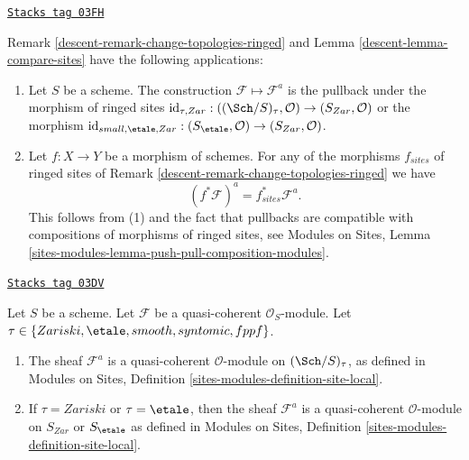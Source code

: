 \begin{remark}
\label{descent-remark-change-topologies-ringed-sites}
\href{https://stacks.math.columbia.edu/tag/03FH}{\texttt{Stacks tag 03FH}}

Remark \ref{descent-remark-change-topologies-ringed}
and
Lemma \ref{descent-lemma-compare-sites}
have the following applications:
\begin{enumerate}
\item Let $S$ be a scheme.
The construction $\mathcal{F} \mapsto \mathcal{F}^a$ is
the pullback under the morphism of ringed sites
$\text{id}_{\tau, Zar} : ((\Sch/S)_\tau, \mathcal{O})
\to (S_{Zar}, \mathcal{O})$
or the morphism
$\text{id}_{small, \etale, Zar} :
(S_\etale, \mathcal{O}) \to (S_{Zar}, \mathcal{O})$.
\item Let $f : X \to Y$ be a morphism of schemes.
For any of the morphisms $f_{sites}$ of ringed sites of
Remark \ref{descent-remark-change-topologies-ringed}
we have
$$
(f^*\mathcal{F})^a = f_{sites}^*\mathcal{F}^a.
$$
This follows from (1) and the fact that pullbacks are compatible with
compositions of morphisms of ringed sites, see
Modules on Sites,
Lemma \ref{sites-modules-lemma-push-pull-composition-modules}.
\end{enumerate}
\end{remark}

\begin{lemma}
\label{descent-lemma-quasi-coherent-gives-quasi-coherent}
\href{https://stacks.math.columbia.edu/tag/03DV}{\texttt{Stacks tag 03DV}}

Let $S$ be a scheme.
Let $\mathcal{F}$ be a quasi-coherent $\mathcal{O}_S$-module.
Let $\tau \in \{Zariski, \linebreak[0] \etale, \linebreak[0]
smooth, \linebreak[0] syntomic, \linebreak[0] fppf\}$.
\begin{enumerate}
\item The sheaf $\mathcal{F}^a$ is a quasi-coherent
$\mathcal{O}$-module on $(\Sch/S)_\tau$, as defined in
Modules on Sites, Definition \ref{sites-modules-definition-site-local}.
\item If $\tau = Zariski$ or $\tau = \etale$, then the sheaf
$\mathcal{F}^a$ is a quasi-coherent $\mathcal{O}$-module on
$S_{Zar}$ or $S_\etale$ as defined in
Modules on Sites, Definition \ref{sites-modules-definition-site-local}.
\end{enumerate}
\end{lemma}

